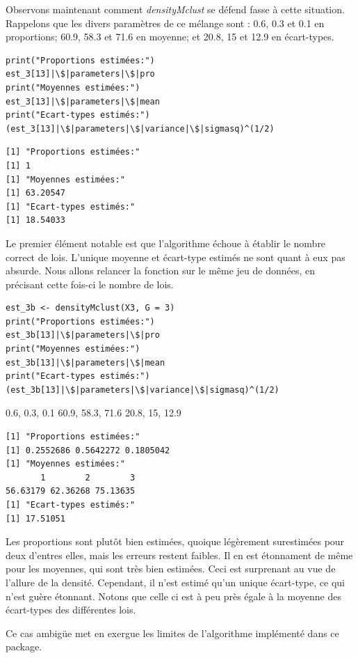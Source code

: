 \documentclass[frenchb]{report}
\newcommand{\1}{\mathbbm{1}}
\theoremstyle{definition}\newtheorem{defn}{Définition}
\theoremstyle{definition}\newtheorem{exm}{Exemple}
\theoremstyle{definition}\newtheorem{nota}{Notation}
\theoremstyle{definition}\newtheorem{rem}{Remarque}
\begin{document}
\begin{appendices}
Observons maintenant comment \textit{densityMclust} se défend fasse à cette situation. \newline
Rappelons que les divers paramètres de ce mélange sont : 0.6, 0.3 et 0.1 en proportions; 60.9, 58.3 et 71.6 en moyenne; et 20.8, 15 et 12.9 en écart-types.
\begin{lstlisting}
print("Proportions estimées:")
est_3[13]|\$|parameters|\$|pro
print("Moyennes estimées:")
est_3[13]|\$|parameters|\$|mean
print("Ecart-types estimés:")
(est_3[13]|\$|parameters|\$|variance|\$|sigmasq)^(1/2)
\end{lstlisting}

\begin{verbatim}
[1] "Proportions estimées:"
[1] 1
[1] "Moyennes estimées:"
[1] 63.20547
[1] "Ecart-types estimés:"
[1] 18.54033
\end{verbatim}
Le premier élément notable est que l'algorithme échoue à établir le nombre correct de lois. L'unique moyenne et écart-type estimés ne sont quant à eux pas absurde. \newline
%
Nous allons relancer la fonction sur le même jeu de données, en précisant cette fois-ci le nombre de lois.
\begin{lstlisting}
est_3b <- densityMclust(X3, G = 3)
print("Proportions estimées:")
est_3b[13]|\$|parameters|\$|pro
print("Moyennes estimées:")
est_3b[13]|\$|parameters|\$|mean
print("Ecart-types estimés:")
(est_3b[13]|\$|parameters|\$|variance|\$|sigmasq)^(1/2)
\end{lstlisting}
0.6, 0.3,  0.1 
60.9, 58.3, 71.6 
20.8, 15, 12.9
\begin{verbatim}
[1] "Proportions estimées:"
[1] 0.2552686 0.5642272 0.1805042
[1] "Moyennes estimées:"
       1        2        3 
56.63179 62.36268 75.13635 
[1] "Ecart-types estimés:"
[1] 17.51051
\end{verbatim}

Les proportions sont plutôt bien estimées, quoique légèrement surestimées pour deux d'entres elles, mais les erreurs restent faibles. Il en est étonnament de même pour les moyennes, qui sont très bien estimées. Ceci est surprenant au vue de l'allure de la densité. Cependant, il n'est estimé qu'un unique écart-type, ce qui n'est guère étonnant. Notons que celle ci est à peu près égale à la moyenne des écart-types des différentes lois. \newline

Ce cas ambigüe met en exergue les limites de l'algorithme implémenté dans ce package.


\end{appendices}
\end{document}
